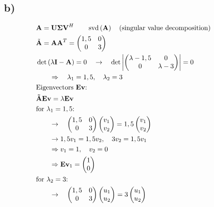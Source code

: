 \subsection*{b)}
\begin{align*}
	&\mathbf{A=U\Sigma V}^{H}\qquad\svd\left(\mathbf{A}\right)\quad\text{(singular value decomposition)}& \\
	&\tilde{\mathbf{A}}=\mathbf{AA}^{T}=
	\begin{pmatrix}
	1,5 & 0 \\
	0 & 3
	\end{pmatrix}& \\
	&\det\left(\lambda\mathbf{I-A}\right)=0\quad\rightarrow\quad\det\left|
	\begin{pmatrix}
	\lambda-1,5 & 0 \\
	0 & \lambda-3
	\end{pmatrix}\right|=0& \\
	&\qquad\Rightarrow\quad\lambda_{1}=1,5,\quad\lambda_{2}=3& \\
	&\text{Eigenvectors $\mathbf{Ev}$:}& \\
	&\mathbf{\tilde{A}Ev}=\lambda\mathbf{Ev}& \\
	&\text{for $\lambda_{1}=1,5$:}& \\
	&\qquad\rightarrow\quad
	\begin{pmatrix}
	1,5 & 0 \\
	0 & 3
	\end{pmatrix}\begin{pmatrix}v_{1}\\v_{2}\end{pmatrix}=1,5\begin{pmatrix}v_{1}\\v_{2}\end{pmatrix}& \\
	&\qquad\rightarrow 1,5v_{1}=1,5v_{2},\quad 3v_{2}=1,5v_{1}& \\
	&\qquad\Rightarrow v_{1}=1,\quad v_{2}=0& \\
	&\qquad\Rightarrow\mathbf{Ev}_{1}=\begin{pmatrix}1\\0\end{pmatrix}& \\
	&\text{for $\lambda_{2}=3$:}& \\
	&\qquad\rightarrow\quad
	\begin{pmatrix}
	1,5 & 0 \\
	0 & 3
	\end{pmatrix}\begin{pmatrix}u_{1}\\u_{2}\end{pmatrix}=3\begin{pmatrix}u_{1}\\u_{2}\end{pmatrix}& \\

\end{align*}
